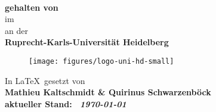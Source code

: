 \begin{titlepage}
	\begin{center}
		\makeatletter
		
		\thispagestyle{empty}
		
		\Huge\textbf{\@title} \\
		\vspace{5mm}
		\Large\textbf{ gehalten von \@author} \\
		\large{im \@date} \\
		\vspace{5mm}
		\large{an der} \\
		\Large\textbf{Ruprecht-Karls-Universität Heidelberg} \\
		\vfill
		\begin{figure}[H]
			\centering
			\texttt{[image: figures/logo-uni-hd-small]}
		\end{figure}
	    \vfill
		\Large
		In \LaTeX \ gesetzt von \\ 
		\vspace{3mm}
		\bfseries{
		Mathieu Kaltschmidt
		\& 
		Quirinus Schwarzenböck}\\ 	
	   \vfill
	   \normalfont
	   aktueller Stand: \  \textit{\today}
	   \vfill
		\makeatother
	\end{center}
\blankpage
\end{titlepage}
